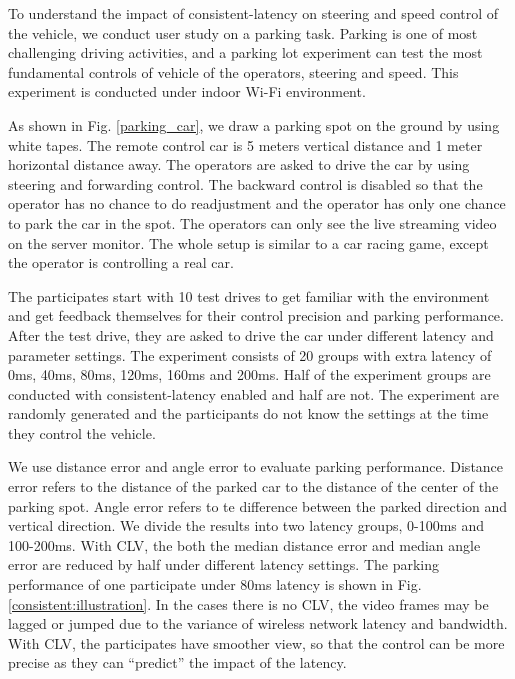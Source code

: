 To understand the impact of consistent-latency on
steering and speed control of the vehicle, 
we conduct user study on a parking task.
Parking is one of most challenging driving activities, 
and a parking lot experiment can test the most fundamental 
controls of vehicle of the operators, steering and speed.
This experiment is conducted under indoor Wi-Fi environment. 
 
As shown in Fig. \ref{parking_car}, 
we draw a parking spot on the ground by using white tapes.
The remote control car is 5 meters vertical distance and 1 meter horizontal distance away. 
The operators are asked to drive the car by using
steering and forwarding control.
The backward control is disabled so that the operator has no
chance to do readjustment and the operator
has only one chance to park the car in the spot.   
The operators can only see the live streaming video on the server monitor. 
The whole setup is similar to a car racing game, except
the operator is controlling a real car. 


The participates start with 10 test drives to get familiar with 
the environment and get feedback themselves for their
control precision and parking performance. 
After the test drive, they are asked to drive the car under
different latency and parameter settings. 
The experiment consists of 20 groups with extra latency
of 0ms, 40ms, 80ms, 120ms, 160ms and 200ms. 
Half of the experiment groups are conducted with consistent-latency
enabled and half are not.
The experiment are randomly generated and the participants
do not know the settings at the time they control the vehicle. 


We use distance error and angle error to evaluate
parking performance. 
Distance error refers to the distance of the parked car to the distance
of the center of the parking spot. 
Angle error refers to te difference between the parked direction and vertical direction.
We divide the results into two latency groups, 0-100ms and 100-200ms. 
With CLV, the both the median distance error and median angle error
are reduced by half under different latency settings. 
The parking performance of one participate under 80ms latency is shown
in Fig. \ref{consistent:illustration}. 
In the cases there is no CLV, the video frames may be lagged or jumped due to
the variance of wireless network latency and bandwidth. 
With CLV, the participates have smoother view, so that 
the control can be more precise as they can 
``predict'' the impact of the latency. 



